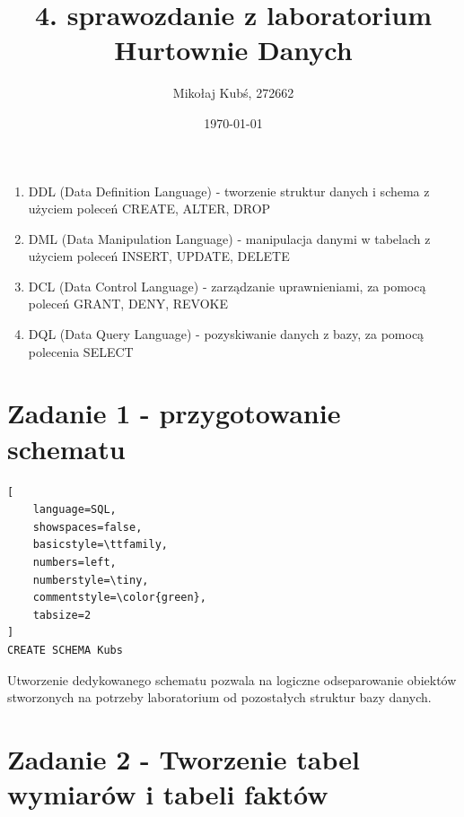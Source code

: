 \documentclass[a4paper,12pt]{article}
\title{4. sprawozdanie z laboratorium Hurtownie Danych}
\author{Mikołaj Kubś, 272662}
\date{\today}
\begin{document}
\maketitle

\begin{enumerate}
    \item DDL (Data Definition Language) - tworzenie struktur danych i schema z użyciem poleceń CREATE, ALTER, DROP
    \item DML (Data Manipulation Language) - manipulacja danymi w tabelach z użyciem poleceń INSERT, UPDATE, DELETE
    \item DCL (Data Control Language) - zarządzanie uprawnieniami, za pomocą poleceń GRANT, DENY, REVOKE
    \item DQL (Data Query Language) - pozyskiwanie danych z bazy, za pomocą polecenia SELECT
\end{enumerate}

\section{Zadanie 1 - przygotowanie schematu}

 {\small
  \begin{lstlisting}[
	language=SQL,
	showspaces=false,
	basicstyle=\ttfamily,
	numbers=left,
	numberstyle=\tiny,
	commentstyle=\color{green},
	tabsize=2
]
CREATE SCHEMA Kubs
\end{lstlisting}}

Utworzenie dedykowanego schematu pozwala na logiczne odseparowanie obiektów stworzonych na potrzeby laboratorium od pozostałych struktur bazy danych.

\section{Zadanie 2 - Tworzenie tabel wymiarów i tabeli faktów}
\end{document}
